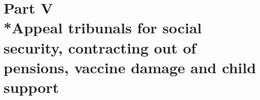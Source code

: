 \documentclass[12pt,a4paper]{article}
\begin{document}
%
%
%
%

\section[Part V --- Appeal tribunals for social security, contracting out of pensions, vaccine damage and child support]{Part V\\*Appeal tribunals for social security, contracting out of pensions, vaccine damage and child support}

\end{document}
